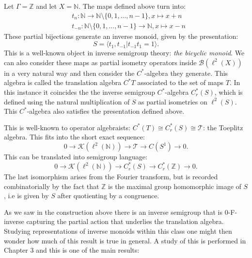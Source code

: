 \begin{example}\label{Ex:Int2}
Let $\Gamma=\mathbb{Z}$ and let $X=\mathbb{N}$. The maps defined above turn into:
\begin{eqnarray*}
& t_{n}: \mathbb{N} \rightarrow \mathbb{N}\setminus \lbrace 0,1,...,n-1 \rbrace, x \mapsto x+n \\
&t_{-n}: \mathbb{N}\setminus \lbrace 0,1,...,n-1 \rbrace \rightarrow \mathbb{N} , x \mapsto x-n
\end{eqnarray*} 
These partial bijections generate an inverse monoid, given by the presentation:
\begin{equation*}
S=\langle t_{1},t_{-1} | t_{-1}t_{1}=1 \rangle.
\end{equation*}
This is a well-known object in inverse semigroup theory: \textit{the bicyclic monoid}. We can also consider these maps as partial isometry operators inside $\mathcal{B}(\ell^{2}(X))$ in a very natural way and then consider the $C^{*}$-algebra they generate. This algebra is called the translation algebra $C^{*}T$ associated to the set of maps $T$. In this instance it coincides the the inverse semigroup $C^{*}$-algebra $C^{*}_{r}(S)$, which is defined using the natural multiplication of $S$ as partial isometries on $\ell^{2}(S)$. This $C^{*}$-algebra also satisfies the presentation defined above.

This is well-known to operator algebraists: $C^{*}(T)\cong C^{*}_{r}(S) \cong \mathcal{T}$: the Toeplitz algebra. This fits into the short exact sequence:
\begin{equation*}
0 \rightarrow \mathcal{K}(\ell^{2}(\mathbb{N})) \rightarrow \mathcal{T} \rightarrow C(S^{1}) \rightarrow 0.
\end{equation*}
This can be translated into semigroup language:
\begin{equation*}
0 \rightarrow \mathcal{K}(\ell^{2}(\mathbb{N})) \rightarrow C^{*}_{r}(S) \rightarrow C^{*}_{r}(\mathbb{Z}) \rightarrow 0.
\end{equation*}
The last isomorphism arises from the Fourier transform, but is recorded combinatorially by the fact that $\mathbb{Z}$ is the maximal group homomorphic image of $S$, i.e is given by $S$ after quotienting by a congruence. 
\end{example}

As we saw in the construction above there is an inverse semigroup that is $0$-F-inverse capturing the partial action that underlies the translation algebra. Studying representations of inverse monoids within this class one might then wonder how much of this result is true in general. A study of this is performed in Chapter 3 and this is one of the main results:

